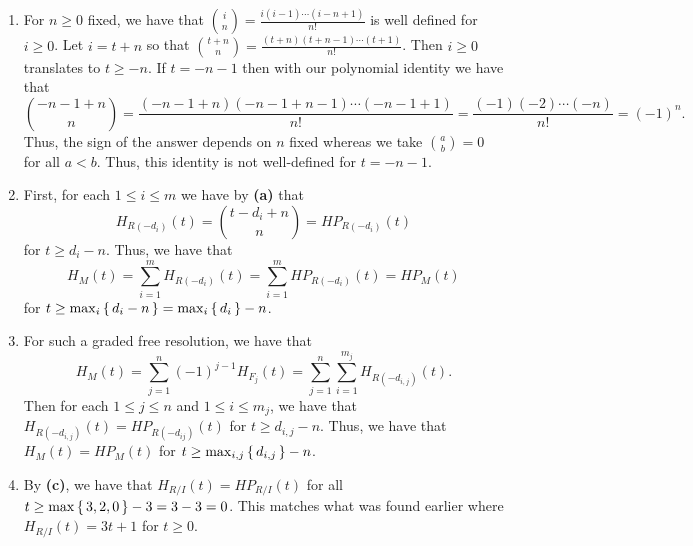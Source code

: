 \documentclass[letterpaper, 11pt, oneside]{book}
\begin{document}
\clearpage

\begin{sol}\label{ex:UAG_6.4.13}
  \begin{enumerate}
    \item For $n \geq 0$ fixed, we have that $\binom{i}{n} =  \frac{i (i - 1) \cdots (i - n + 1)}{n!}$ is well defined for $i \geq 0$.
          Let $i = t + n$ so that $\binom{t + n}{n} = \frac{(t + n)(t + n - 1) \cdots (t + 1)}{n!}$.
          Then $i \geq 0$ translates to $t \geq -n$.
          If $t = -n - 1$ then with our polynomial identity we have that
          \[
            \binom{-n - 1 + n}{n} = \frac{(-n - 1 + n)(-n - 1 + n - 1) \cdots (-n - 1 + 1)}{n!} = \frac{(-1)(-2) \cdots (-n)}{n!} = (-1)^{n}.
          \]
          Thus, the sign of the answer depends on $n$ fixed whereas we take $\binom{a}{b} = 0$ for all $a < b$.
          Thus, this identity is not well-defined for $t = -n - 1$.
    \item First, for each $1 \leq i \leq m$ we have by \textbf{(a)} that
          \[
            H_{R(-d_{i})}(t) = \binom{t - d_{i} + n}{n} = HP_{R(-d_{i})}(t)
          \]
          for $t \geq d_{i} - n$.
          Thus, we have that
          \[
            H_{M}(t) = \sum_{i = 1}^{m} H_{R(-d_{i})}(t) = \sum_{i = 1}^{m} HP_{R(-d_{i})}(t) = HP_{M}(t)
          \]
          for $t \geq \max_{i}\set{d_{i} - n} = \max_{i}\set{d_{i}} - n$.
    \item For such a graded free resolution, we have that
          \[
            H_{M}(t) = \sum_{j = 1}^{n} (-1)^{j - 1} H_{F_{j}}(t) = \sum_{j = 1}^{n} \sum_{i = 1}^{m_{j}} H_{R(-d_{i, j})}(t).
          \]
          Then for each $1 \leq j \leq n$ and $1 \leq i \leq m_{j}$, we have that $H_{R(-d_{i, j})}(t) = HP_{R(-d_{ij})}(t)$ for $t \geq d_{i, j} - n$.
          Thus, we have that $H_{M}(t) = HP_{M}(t)$ for $t \geq \max_{i, j}\set{d_{i, j}} - n$.
    \item By \textbf{(c)}, we have that $H_{R / I}(t) = HP_{R / I}(t)$ for all $t \geq \max\set{3, 2, 0} - 3 = 3 - 3 = 0$.
          This matches what was found earlier where $H_{R / I}(t) = 3t + 1$ for $t \geq 0$.
  \end{enumerate}
\end{sol}

\clearpage
\end{document}
